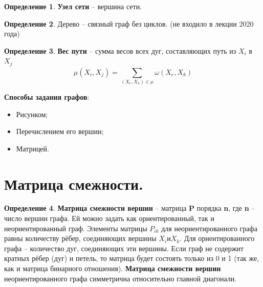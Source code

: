 \documentclass[12pt, a4paper, oneside]{article}
\theoremstyle{plain} %
\theoremstyle{definition}
\newtheorem*{definition}{Определение}  %
\newcommand{\indef}[1]{\textbf{ \color{dark_red} #1}}
\begin{document}
\begin{definition}
\indef{Узел сети} – вершина сети.
\end{definition}

\begin{definition}
Дерево – связный граф без циклов. (не входило в лекции 2020 года)
\end{definition}

\begin{definition}
\indef{Вес пути} – сумма весов всех дуг, составляющих путь из $X_i$ в $X_j$
\[ \mu(X_i,X_j) = \sum_{(X_e,X_k) \in \mu}^{} \omega(X_e,X_k) \]
\end{definition}

\textbf{Способы задания графов}:

\begin{itemize}

    \item Рисунком;  

    \item Перечислением его вершин;        

    \item Матрицей.

\end{itemize}

\section{Матрица смежности.}

\begin{definition}
\indef{Матрица смежности вершин} – матрица \textbf{P} порядка \textbf{n}, где \textbf{n} – число вершин графа. Ей можно задать как ориентированный, так и неориентированный граф. Элементы матрицы \textbf{$P_{ik}$} для неориентированного графа равны количеству рёбер, соединяющих вершины $X_i и X_k$. Для ориентированного графа – количество дуг, соединяющих эти вершины. Если граф не содержит кратных рёбер (дуг) и петель, то матрица будет состоять только из 0 и 1 (так же, как и матрица бинарного отношения). \textbf{Матрица смежности вершин} неориентированного графа симметрична относительно главной диагонали. 
\end{definition}
\end{document}
